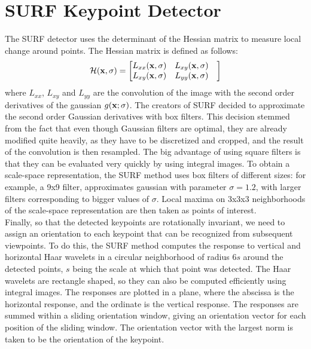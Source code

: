 \section{SURF Keypoint Detector}
The SURF detector uses the determinant of the Hessian matrix to measure local change around points. The Hessian matrix is defined as follows:
\begin{equation}
  \mathcal{H}(\bf{x},\sigma) =  \begin{bmatrix}
  L_{xx}(\bf{x},\sigma) & L_{xy}(\bf{x},\sigma) &\\
  L_{xy}(\bf{x},\sigma) & L_{yy}(\bf{x},\sigma)
\end{bmatrix}
\end{equation}
where $L_{xx}$, $L_{xy}$ and $L_{yy}$ are the convolution of the image with the second order derivatives of the gaussian $g(\bf{x};\sigma)$. The creators of SURF decided to approximate the second order Gaussian derivatives with box filters. This decision stemmed from the fact that even though Gaussian filters are optimal, they are already modified quite heavily, as they have to be discretized and cropped, and the result of the convolution is then resampled. The big advantage of using square filters is that they can be evaluated very quickly by using integral images. To obtain a scale-space representation, the SURF method uses box filters of different sizes: for example, a 9x9 filter, approximates gaussian with parameter $\sigma = 1.2$, with larger filters corresponding to bigger values of $\sigma$. Local maxima on 3x3x3 neighborhoods of the scale-space representation are then taken as points of interest.\\
Finally, so that the detected keypoints are rotationally invariant, we need to assign an orientation to each keypoint that can be recognized from subsequent viewpoints. To do this, the SURF method computes the response to vertical and horizontal Haar wavelets in a circular neighborhood of radius $6s$ around the detected points, $s$ being the scale at which that point was detected. The Haar wavelets are rectangle shaped, so they can also be computed efficiently using integral images. The responses are plotted in a plane, where the abscissa is the horizontal response, and the ordinate is the vertical response. The responses are summed within a sliding orientation window, giving an orientation vector for each position of the sliding window. The orientation vector with the largest norm is taken to be the orientation of the keypoint.
\cite{bay_surf}

